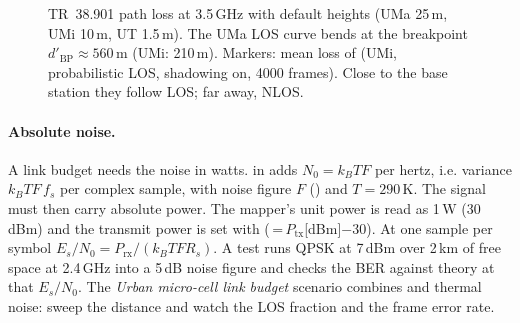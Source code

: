 \begin{figure}[htbp]
\centering
{}
\caption{TR~38.901 path loss at 3.5\,GHz with default heights (UMa 25\,m, UMi 10\,m, UT 1.5\,m).
The UMa LOS curve bends at the breakpoint $d'_{\mathrm{BP}}\approx560$\,m (UMi: 210\,m). Markers:
mean loss of  (UMi, probabilistic LOS, shadowing on, 4000 frames). Close to the
base station they follow LOS; far away, NLOS.}
\label{fig:pathloss}
\end{figure}

\paragraph{Absolute noise.} A link budget needs the noise in watts.  in
 adds $N_0=k_BTF$ per hertz, i.e. variance $k_BTF\,f_s$ per complex
sample, with noise figure $F$ () and $T=290$\,K. The signal must then carry
absolute power. The mapper's unit power is read as 1\,W (30\,dBm) and the transmit power is set
with  (\,=\,$P_{\mathrm{tx}}$[dBm]$-30$). At one sample per symbol
$E_s/N_0=P_{\mathrm{rx}}/(k_BTFR_s)$. A test runs QPSK at 7\,dBm over 2\,km of free space at
2.4\,GHz into a 5\,dB noise figure and checks the BER against theory at that $E_s/N_0$. The
\emph{Urban micro-cell link budget} scenario combines  and thermal noise: sweep the
distance and watch the LOS fraction and the frame error rate.

